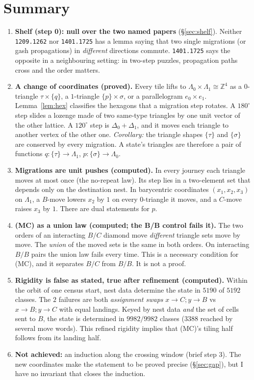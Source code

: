 \documentclass[11pt]{article}
\theoremstyle{definition}
\newcommand{\toB}{\!\to\!B}
\newcommand{\toC}{\!\to\!C}
\begin{document}
\section*{Summary}
\begin{enumerate}
\item \textbf{Shelf (step 0): null over the two named papers} (\S\ref{sec:shelf}). Neither \texttt{1209.1262} nor \texttt{1401.1725} has a lemma
saying that two single migrations (or gash propagations) in \emph{different} directions commute. \texttt{1401.1725} says the opposite in a
neighbouring setting: in two-step puzzles, propagation paths cross and the order matters.
\item \textbf{A change of coordinates (proved).} Every tile lifts to $\Lambda_0\times\Lambda_1\cong\mathbb Z^4$ as a $0$-triangle
$\tau\times\{q\}$, a $1$-triangle $\{p\}\times\sigma$, or a parallelogram $e_0\times e_1$. Lemma~\ref{lem:hex} classifies the hexagons that
a migration step rotates. A $180^\circ$ step slides a lozenge made of two same-type triangles by one unit vector of the other lattice. A
$120^\circ$ step is $\Delta_0+\Delta_1$, and it moves each triangle to another vertex of the other one. \emph{Corollary:} the triangle
shapes $\{\tau\}$ and $\{\sigma\}$ are conserved by every migration. A state's triangles are therefore a pair of functions
$q:\{\tau\}\to\Lambda_1$, $p:\{\sigma\}\to\Lambda_0$.
\item \textbf{Migrations are unit pushes (computed).} In every journey each triangle moves at most once (the no-repeat law). Its step lies in a
two-element set that depends only on the destination nest. In barycentric coordinates $(x_1,x_2,x_3)$ on $\Lambda_1$, a $B$-move lowers $x_2$
by $1$ on every $0$-triangle it moves, and a $C$-move raises $x_3$ by $1$. There are dual statements for $p$.
\item \textbf{(MC) as a union law (computed; the B/B control fails it).} The two orders of an interacting $B/C$ diamond move
\emph{different} triangle sets move by move. The \emph{union} of the moved sets is the same in both orders. On interacting $B/B$
pairs the union law fails every time. This is a necessary condition for (MC), and it separates $B/C$ from $B/B$. It is not a proof.
\item \textbf{Rigidity is false as stated, true after refinement (computed).} Within the orbit of one census start, nest data determine
the state in $5190$ of $5192$ classes. The $2$ failures are both \emph{assignment swaps} $x\toC;y\toB$ vs $x\toB;y\toC$ with equal landings.
Keyed by nest data \emph{and} the set of cells sent to $B$, the state is determined in $9982/9982$ classes ($3388$ reached by several
move words). This refined rigidity implies that (MC)'s tiling half follows from its landing half.
\item \textbf{Not achieved:} an induction along the crossing window (brief step 3). The new coordinates make the statement to be proved
precise (\S\ref{sec:gap}), but I have no invariant that closes the induction.
\end{enumerate}
\end{document}
